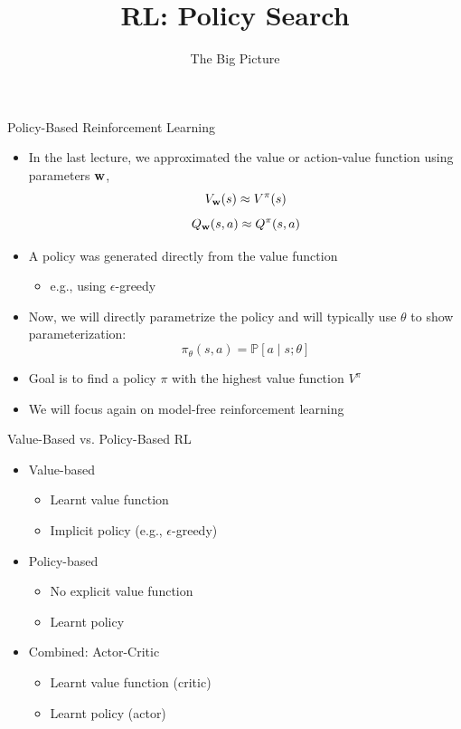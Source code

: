 \documentclass[aspectratio=169]{../latex_main/tntbeamer}  %
\title[RL: Big Picture]{RL: Policy Search}
\subtitle{The Big Picture}
\begin{document}
	
	\maketitle

\begin{frame}[c]{Policy-Based Reinforcement Learning}

\begin{itemize}
	\item In the last lecture, we approximated the value or action-value function
	using parameters $\mathbf{w}$,
	$$V_{\mathbf{w}}(s) \approx V^\pi(s)$$
	$$Q_{\mathbf{w}}(s,a) \approx Q^\pi (s,a) $$
	\item A policy was generated directly from the value function
	\begin{itemize}
		\item e.g., using $\epsilon$-greedy
	\end{itemize}	
	\item Now, we will directly parametrize the policy and will typically
	use $\theta$ to show parameterization:
	$$\pi_\theta (s,a) = \mathbb{P}[ a\mid s; \theta] $$
	\item Goal is to find a policy $\pi$ with the highest value function $V^\pi$
	\item We will focus again on model-free reinforcement learning
\end{itemize}

\end{frame}
\begin{frame}[c]{Value-Based vs. Policy-Based RL}

	\begin{itemize}
		\item Value-based
		\begin{itemize}
			\item Learnt value function
			\item Implicit policy (e.g., $\epsilon$-greedy)
		\end{itemize}
		\item Policy-based
		\begin{itemize}
			\item No explicit value function
			\item Learnt policy
		\end{itemize}
		\item Combined: Actor-Critic
		\begin{itemize}
			\item Learnt value function (critic)
			\item Learnt policy (actor)
		\end{itemize}
		
	\end{itemize}		
	
\end{frame}
\end{document}
